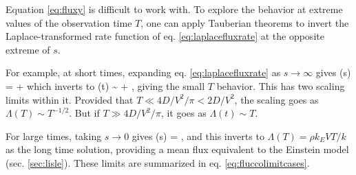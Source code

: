 \label{sec:fluxlimits}
Equation \ref{eq:fluxy} is difficult to work with. To explore the behavior at extreme values of the observation time $T$, one can apply Tauberian theorems \citep{Weiss1994} to invert the Laplace-transformed rate function of eq. \ref{eq:laplacefluxrate} at the opposite extreme of $s$.
	
For example, at short times, expanding eq. \ref{eq:laplacefluxrate} as $s\rightarrow \infty$ gives
\be \tilde{\Lambda}(s) =  +  \ee
which inverts to
\be \Lambda(t) \sim {} + ,\ee
giving the small $T$ behavior.
This has two scaling limits within it. Provided that $T \ll 4D/V^2/\pi < 2 D/V^2$, the scaling goes as $\Lambda(T) \sim T^{-1/2}$. But if $T\gg 4D/V^2/\pi$, it goes as $\Lambda(t) \sim T$.

For large times, taking $s\rightarrow 0 $ gives
\be \tilde{\Lambda}(s) = , \ee
and this inverts to $\Lambda(T) = \rho k_E V T/k$ as the long time solution, providing a mean flux equivalent to the Einstein model (sec. \ref{sec:lisle}).
These limits are summarized in eq. \ref{eq:fluccolimitcases}.
